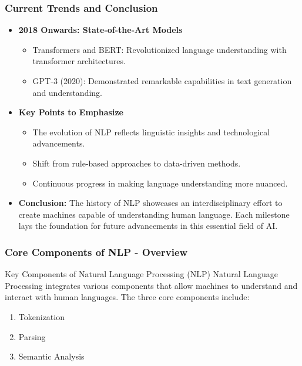 \documentclass{beamer}
\begin{document}
\begin{frame}[fragile]
    \frametitle{Current Trends and Conclusion}
    \begin{itemize}
        \item \textbf{2018 Onwards: State-of-the-Art Models}
        \begin{itemize}
            \item Transformers and BERT: Revolutionized language understanding with transformer architectures.
            \item GPT-3 (2020): Demonstrated remarkable capabilities in text generation and understanding.
        \end{itemize}

        \item \textbf{Key Points to Emphasize}
        \begin{itemize}
            \item The evolution of NLP reflects linguistic insights and technological advancements.
            \item Shift from rule-based approaches to data-driven methods.
            \item Continuous progress in making language understanding more nuanced.
        \end{itemize}
        
        \item \textbf{Conclusion:}
        The history of NLP showcases an interdisciplinary effort to create machines capable of understanding human language. Each milestone lays the foundation for future advancements in this essential field of AI.
    \end{itemize}
\end{frame}

\begin{frame}[fragile]
    \frametitle{Core Components of NLP - Overview}
    \begin{block}{Key Components of Natural Language Processing (NLP)}
        Natural Language Processing integrates various components that allow machines to understand and interact with human languages. The three core components include:
    \end{block}
    \begin{enumerate}
        \item Tokenization
        \item Parsing
        \item Semantic Analysis
    \end{enumerate}
\end{frame}
\end{document}
